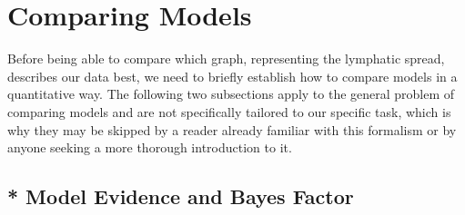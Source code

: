 \documentclass[\relativeRoot/main.tex]{subfiles}
\begin{document}
\section{Comparing Models}
\label{sec:graph:model_comp}

Before being able to compare which graph, representing the lymphatic spread, describes our data best, we need to briefly establish how to compare models in a quantitative way. The following two subsections apply to the general problem of comparing models and are not specifically tailored to our specific task, which is why they may be skipped by a reader already familiar with this formalism or by anyone seeking a more thorough introduction to it.

\subsection{* Model Evidence and Bayes Factor}
\label{subsec:graph:model_comp:evidence}
\end{document}

